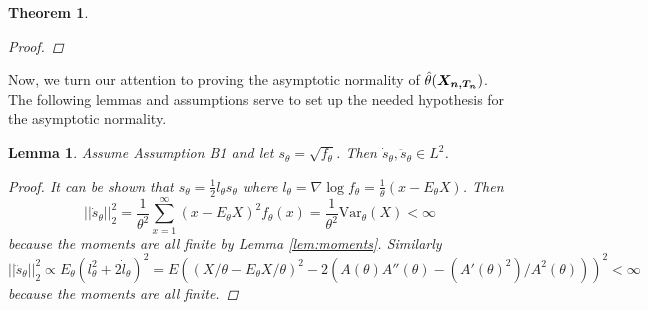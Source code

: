 \documentclass[11 pt]{article}
\newtheorem{lem}{Lemma}
\newtheorem{thm}{Theorem}
\renewcommand{\th}{\theta}
\newcommand{\xra}[1]{\mathop{ \xrightarrow{#1} }}
\newcommand{\boldXnt}{\mbox{\boldmath $X_{n,T_n}$}}
\newcommand{\ddsth}{\ddot{s}_{\theta}}
\newcommand{\dsth}{\dot{s}_{\theta}}
\newcommand{\sth}{s_{\th}}
\newcommand{\fthnx}{f_{\th}}
\newcommand{\dlth}{\dot{l}_{\th}}
\begin{document}
\begin{thm}
\begin{proof}
\end{proof}
\end{thm}

Now, we turn our attention to proving the asymptotic normality of $\hat{\th}(\boldXnt)$. The following lemmas and assumptions serve to set up the needed hypothesis for the asymptotic normality. 

\begin{lem}
\label{lem:l2}
Assume Assumption B1 and let $\sth = \sqrt{f_{\th}}$. Then $\dsth,\ddsth \in L^2$.
\begin{proof}
It can be shown that $s_{\th} = \frac{1}{2} l_{\th} s_{\th}$ where $l_{\th} = \nabla \log \fthnx =  \frac{1}{\th}(x - E_{\th}X)$. Then
\[
||\dsth||_2^2 = \frac{1}{\th^2}\sum_{x=1}^{\infty}(x - E_{\th}X)^2 f_{\th}(x) = \frac{1}{\th^2}\text{Var}_{\th}(X) < \infty
\]
because the moments are all finite by Lemma \ref{lem:moments}. Similarly
\[
||\ddsth||_2^2 \propto E_{\th}(l_{\th}^2 + 2\dlth)^2 = E((X/\th - E_{\th}X/\th)^2 - 2 (A(\th)A''(\th) - (A'(\th)^2)/A^2(\th)))^2 < \infty
\]
because the moments are all finite.
\end{proof}
\end{lem}
\end{document}
